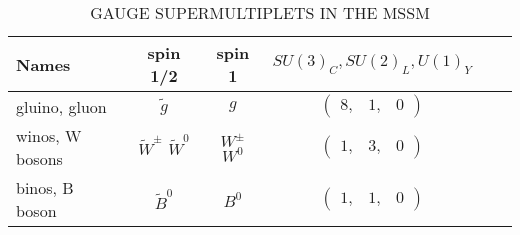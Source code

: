 \begin{table}[htpb]
  \begin{center}
    \caption{GAUGE SUPERMULTIPLETS IN THE MSSM}
    \label{tab:gaugesuper}
    \begin{tabular}{lccccc}
      \toprule
      Names & spin 1/2 & spin 1 & $SU(3)_{C}, SU(2)_{L}, U(1)_{Y}$ \\
      \midrule
      gluino, gluon & $\tilde{g}$ & $g$ & $\begin{pmatrix}8, & 1, & 0\end{pmatrix}$ \\
      winos, W bosons & $\tilde{W}^{\pm}$ $\tilde{W}^{0}$ & $W^{\pm}$ $W^{0}$ & $\begin{pmatrix}1, & 3, & 0\end{pmatrix}$ \\
      binos, B boson & $\tilde{B}^{0}$ & $B^{0}$ & $\begin{pmatrix}1, & 1, & 0\end{pmatrix}$ \\
      \bottomrule
    \end{tabular}
  \end{center}
\end{table}

